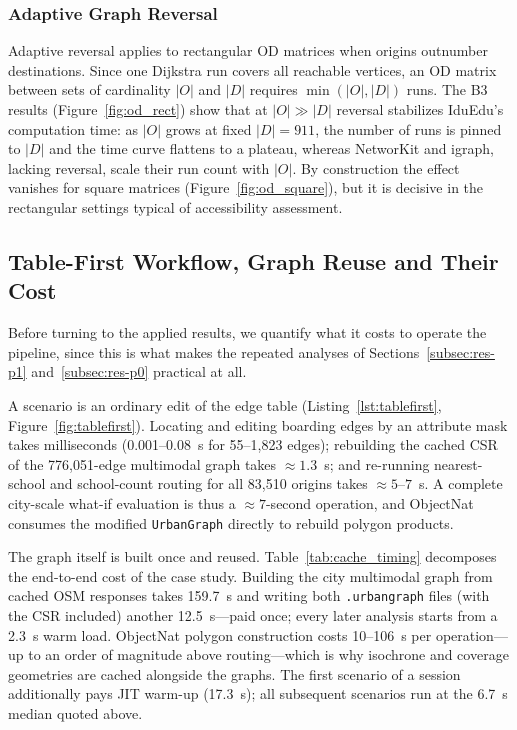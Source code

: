 \documentclass[smartcities,article,submit,moreauthors]{Definitions/mdpi}
\begin{document}
    \subsubsection{Adaptive Graph Reversal}
    \label{subsubsec:abl-reversal}

    Adaptive reversal applies to rectangular OD matrices when origins outnumber destinations.
    Since one Dijkstra run covers all reachable vertices, an OD matrix between sets of cardinality
    $|O|$ and $|D|$ requires $\min(|O|, |D|)$ runs.
    The B3 results (Figure~\ref{fig:od_rect}) show that at $|O| \gg |D|$ reversal stabilizes IduEdu's
    computation time: as $|O|$ grows at fixed $|D| = 911$, the number of runs is pinned to $|D|$ and the
    time curve flattens to a plateau, whereas NetworKit and igraph, lacking reversal, scale their run
    count with $|O|$.
    By construction the effect vanishes for square matrices (Figure~\ref{fig:od_square}), but it is
    decisive in the rectangular settings typical of accessibility assessment.

    \subsection{Table-First Workflow, Graph Reuse and Their Cost}
    \label{subsec:res-workflow}

    Before turning to the applied results, we quantify what it costs to operate the pipeline, since
    this is what makes the repeated analyses of Sections~\ref{subsec:res-p1}
    and~\ref{subsec:res-p0} practical at all.

    A scenario is an ordinary edit of the edge table (Listing~\ref{lst:tablefirst},
    Figure~\ref{fig:tablefirst}).
    Locating and editing boarding edges by an attribute mask takes milliseconds (0.001--0.08~s for
    55--1{,}823 edges); rebuilding the cached CSR of the 776{,}051-edge multimodal graph takes
    ${\approx}1.3$~s; and re-running nearest-school and school-count routing for all 83{,}510 origins
    takes ${\approx}5$--$7$~s.
    A complete city-scale what-if evaluation is thus a ${\approx}7$-second operation, and ObjectNat
    consumes the modified \texttt{UrbanGraph} directly to rebuild polygon products.

    The graph itself is built once and reused.
    Table~\ref{tab:cache_timing} decomposes the end-to-end cost of the case study.
    Building the city multimodal graph from cached OSM responses takes 159.7~s and writing both
    \texttt{.urbangraph} files (with the CSR included) another 12.5~s---paid once; every later
    analysis starts from a 2.3~s warm load.
    ObjectNat polygon construction costs 10--106~s per operation---up to an order of magnitude above
    routing---which is why isochrone and coverage geometries are cached alongside the graphs.
    The first scenario of a session additionally pays JIT warm-up (17.3~s); all subsequent scenarios
    run at the 6.7~s median quoted above.
\end{document}
